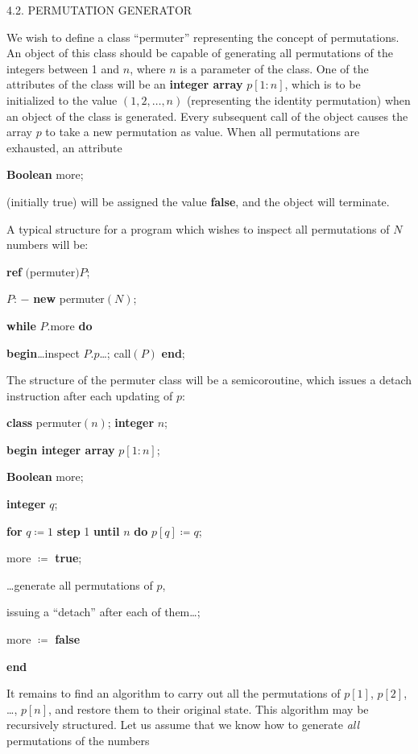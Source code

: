 4.2. PERMUTATION GENERATOR

We wish to define a class ``permuter'' representing the concept of permutations. An object of this class should be capable of generating all permutations of the integers between 1 and $n$, where $n$ is a parameter of the class. One of the attributes of the class will be an \textbf{integer array} $p[1:n]$, which is to be initialized to the value $(1, 2, \dots, n)$ (representing the identity permutation) when an object of the class is generated. Every subsequent call of the object
causes the array $p$ to take a new permutation as value. When all permutations are exhausted, an attribute 

\quad \textbf{Boolean} more;

\noindent
(initially true) will be assigned the value \textbf{false}, and the object will terminate.

A typical structure for a program which wishes to inspect all permutations of $N$ numbers will be:

\quad \textbf{ref} $($permuter$)P$;

\quad $P$: $-$ \textbf{new} permuter$(N)$;

\quad \textbf{while} $P$.more \textbf{do}

\quad \quad \textbf{begin}\dots inspect $P.p$\dots; call$(P)$ \textbf{end};

\noindent
The structure of the permuter class will be a semicoroutine, which issues a detach instruction after each updating of $p$:

\quad \textbf{class} permuter$(n)$; \textbf{integer} $n$;

\quad \quad \textbf{begin integer array} $p[1:n]$;

\quad \quad \quad \textbf{Boolean} more;

\quad \quad \quad \textbf{integer} $q$;

\quad \quad \quad \textbf{for} $q\coloneq 1$ \textbf{step} 1 \textbf{until} $n$ \textbf{do} $p[q]\coloneq q$;

\quad \quad \quad more $\coloneq$ \textbf{true};

\tabto*{3.3em} \dots generate all permutations of $p$,

\quad \quad \quad issuing a ``detach'' after each of them\dots;

\quad \quad \quad more $\coloneq$ \textbf{false}

\quad \quad \textbf{end}

It remains to find an algorithm to carry out all the permutations of $p[1]$, $p[2]$, \dots, $p[n]$, and restore them to their original state. This algorithm may be recursively structured. Let us assume that we know how to generate \textit{all} permutations of the numbers

